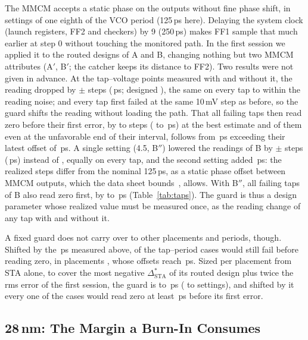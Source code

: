 \documentclass[conference]{IEEEtran}
\newcommand{\Dst}{\Delta^{*}_\mathrm{STA}}
\begin{document}
The MMCM accepts a static phase on the outputs without fine phase shift, in settings of one eighth
of the VCO period (125\,ps here). Delaying the system clock (launch registers, FF2 and checkers) by
9\textdegree{} (250\,ps) makes FF1 sample that much earlier at step 0 without touching the monitored
path. In the first session we applied it to the routed designs of A and B, changing nothing but two
MMCM attributes (A$'$, B$'$; the catcher keeps its distance to FF2). Two results were not given in
advance. At the \vGuardPtN{} tap--voltage points measured with and without it, the reading dropped
by \vGuardPtSt$\pm$\vGuardPtSd{} steps (\vGuardPtPs\,ps; designed \vGuardDesignSt), the same on every
tap to within the reading noise; and every tap first failed at the same 10\,mV step as before, so
the guard shifts the reading without loading the path. That all \vGuardPairs{} failing taps then
read zero before their first error, by \vTapGMinSt{} to \vTapGMaxSt{} steps (\vTapGMinPs{} to
\vTapGMaxPs\,ps) at the best estimate and \vTapGEarly{} of them even at the unfavorable end of their
interval, follows from \vGuardPtPs\,ps exceeding their latest offset of \vWorstLatePs\,ps. A single
setting (4.5\textdegree, B$''$) lowered the readings of B by \vGuardHPtSt$\pm$\vGuardHPtSd{} steps
(\vGuardHPtPs\,ps) instead of \vGuardHDesignSt, equally on every tap, and the second setting added
\vGuardStepTwoPs\,ps: the realized steps differ from the nominal 125\,ps, as a static phase offset
between MMCM outputs, which the data sheet bounds~\cite{ds931}, allows. With B$''$, all \vTapGhN{}
failing taps of B also read zero first, by \vTapGhMinPs{} to \vTapGhMaxPs\,ps (Table~\ref{tab:taps}).
The guard is thus a design parameter whose realized value must be measured once, as the reading
change of any tap with and without it.

A fixed guard does not carry over to other placements and periods, though. Shifted by the
\vGuardPtPs\,ps measured above, \vGuardFixLate{} of the \vAllCases{} tap--period cases would
still fail before reading zero, in placements \vGuardFixLatePl, whose offsets reach
\vAllMinPs\,ps. Sized per placement from STA alone, to cover the most negative $\Dst$ of its routed
design plus twice the rms error of the first session, the guard is \vGuardPlLo{} to
\vGuardPlHi\,ps (\vGuardPlSetLo{} to \vGuardPlSetHi{} settings), and shifted by it every one of the
\vAllCases{} cases would read zero at least \vGuardPlMinPs\,ps before its first error.

\subsection{\texorpdfstring{28\,nm}{28 nm}: The Margin a Burn-In Consumes}\label{sec:res28}
\end{document}
